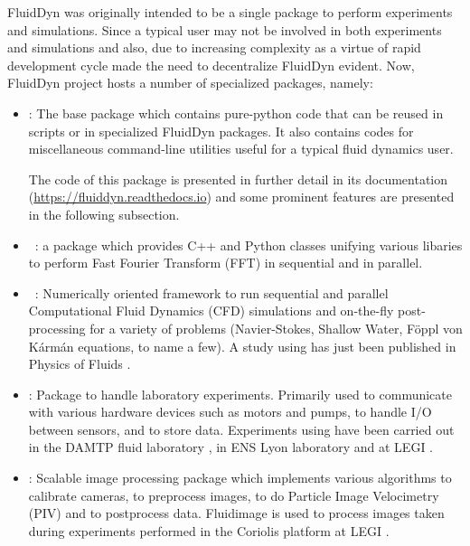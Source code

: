 FluidDyn was originally intended to be a single package to perform experiments
and simulations. Since a typical user may not be involved in both experiments
and simulations and also, due to increasing complexity as a virtue of rapid
development cycle made the need to decentralize FluidDyn evident.
Now, FluidDyn project hosts a number of specialized packages, namely:

\begin{itemize}
\item {}: The base package which contains pure-python code that can
be reused in scripts or in specialized FluidDyn packages. It also contains codes
for miscellaneous command-line utilities useful for a typical fluid dynamics user.

The code of this package is presented in further detail in its documentation
(\url{https://fluiddyn.readthedocs.io}) and some prominent features are presented
in the following subsection.

\item {}~\cite[see the companion paper][]{fluidfft}: a package which
provides C++ and Python classes unifying various libaries to perform Fast Fourier
Transform (FFT) in sequential and in parallel.

\item {}~\cite[see the companion paper][]{fluidsim}: Numerically
oriented framework to run sequential and parallel Computational Fluid Dynamics
(CFD) simulations and on-the-fly post-processing for a variety of problems
(Navier-Stokes, Shallow Water, F\"oppl von K\'arm\'an equations, to name a few).
A study using  has just been published in Physics of Fluids
\cite[]{LindborgMohanan2017}.

\item {}: Package to handle laboratory experiments. Primarily used to
communicate with various hardware devices such as motors and pumps, to handle I/O
between sensors, and to store data.
%
Experiments using  have been carried out in the DAMTP fluid
laboratory \cite[Cambridge, UK. cf.][]{LeclercqPartridgeAugierDalzielKerswell2016}, in ENS Lyon laboratory
\cite[Lyon, France][]{salort2018} and at LEGI \cite[Grenoble, France][]{ISSF2016}.

\item {}: Scalable image processing package which implements
various algorithms to calibrate cameras, to preprocess images, to do Particle
Image Velocimetry (PIV) and to postprocess data.
%
Fluidimage is used to process images taken during experiments performed in the
Coriolis platform at LEGI \cite[]{ISSF2016}.


\end{itemize}
